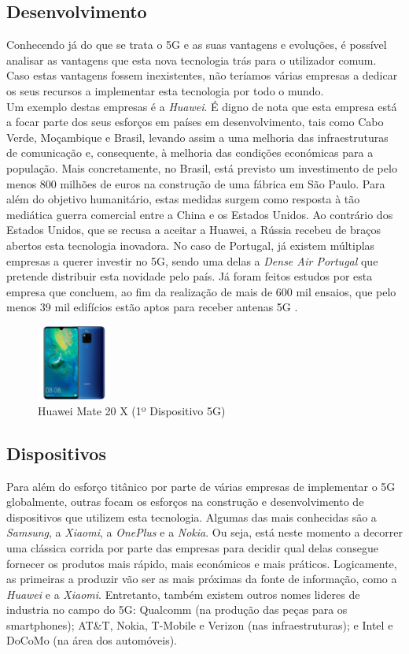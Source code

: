 \documentclass{llncs}
\begin{document}
\subsection{Desenvolvimento}
Conhecendo já do que se trata o 5G e as suas vantagens e evoluções,
é possível analisar as vantagens que esta nova tecnologia trás para
o utilizador comum.\\
Caso estas vantagens fossem inexistentes, não teríamos várias empresas
a dedicar os seus recursos a implementar esta tecnologia por todo o 
mundo.\\
Um exemplo destas empresas é a \textit{Huawei}.
É digno de nota que esta empresa está a focar parte dos seus esforços 
em países em desenvolvimento, tais como Cabo Verde, Moçambique e 
Brasil, levando assim a uma melhoria das infraestruturas de 
comunicação e, consequente, à melhoria das condições económicas para a
população. Mais concretamente, no Brasil, está previsto um
investimento de pelo menos 800 milhões de euros na construção de uma 
fábrica em São Paulo. Para além do objetivo humanitário, estas medidas
surgem como resposta à tão mediática guerra comercial entre a China e
os Estados Unidos.
Ao contrário dos Estados Unidos, que se recusa a aceitar a Huawei, a
Rússia recebeu de braços abertos esta tecnologia inovadora.
No caso de Portugal, já existem múltiplas empresas a querer investir
no 5G, sendo uma delas a \textit{Dense Air Portugal} que pretende
distribuir esta novidade pelo país.
Já foram feitos estudos por esta empresa que concluem, ao fim da
realização de mais de 600 mil ensaios, que pelo menos 39 mil edifícios
estão aptos para receber antenas 5G \cite{5GPortugal}.
\begin{figure}
  \centering
  \includegraphics[width=0.22\textwidth]{images/huawei.jpg}
  \caption{Huawei Mate 20 X (1º Dispositivo 5G)}
  \label{fig:thunderbolt}
\end{figure}
\subsection{Dispositivos}
Para além do esforço titânico por parte de várias empresas de
implementar o 5G globalmente, outras focam os esforços na 
construção e desenvolvimento de dispositivos que utilizem
esta tecnologia. Algumas das mais conhecidas são a \textit{Samsung}, a
\textit{Xiaomi}, a \textit{OnePlus} e a \textit{Nokia}.
Ou seja, está neste momento a decorrer uma clássica corrida por parte
das empresas para decidir qual delas consegue fornecer os produtos
mais rápido, mais económicos e mais práticos.
Logicamente, as primeiras a produzir vão ser as mais próximas da fonte
de informação, como a \textit{Huawei} e a \textit{Xiaomi}.
Entretanto, também existem outros nomes lideres de industria no campo 
do 5G: Qualcomm (na produção das peças para os smartphones);
AT\&T, Nokia, T-Mobile e Verizon (nas infraestruturas); e Intel e 
DoCoMo (na área dos automóveis).
\end{document}
